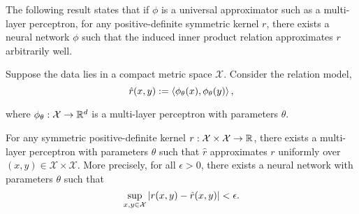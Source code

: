 
The following result states that if $\phi$ is a universal approximator such as a multi-layer perceptron, for any positive-definite symmetric kernel $r$, there exists a neural network $\phi$ such that the induced inner product relation approximates $r$ arbitrarily well.

\begin{theorem}
	\label{theoremm:symmetric_inner_prod_rels_func_class}
	\hphantom{~}

	Suppose the data lies in a compact metric space \(\mathcal{X}\). Consider the relation model,
	\begin{equation*}
		\hat{r}(x, y) := \left \langle \phi_{\theta}(x), \phi_{\theta}(y) \right\rangle,
	\end{equation*}

    \noindent where $\phi_{\theta}: {\mathcal{X}} \to \mathbb{R}^d$ is a multi-layer perceptron with parameters $\theta$.

	For any symmetric positive-definite kernel $r: {\mathcal{X}} \times {\mathcal{X}} \to \mathbb{R}$, there exists a multi-layer perceptron with parameters $\theta$ such that $\hat{r}$ approximates $r$ uniformly over \((x,y) \in \mathcal{X}\times\mathcal{X}\). More precisely, for all \(\epsilon > 0\), there exists a neural network with parameters $\theta$ such that 
    \[\sup_{x,y \in \mathcal{X}}{\left\lvert r(x,y) - \hat{r}(x,y)\right\rvert} < \epsilon.\]
\end{theorem}

